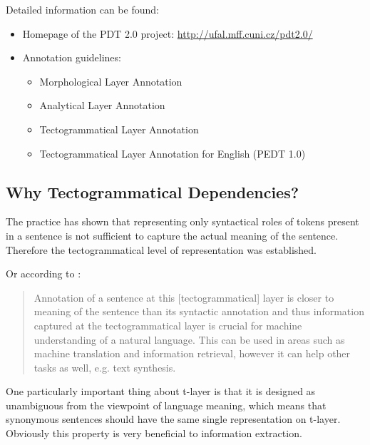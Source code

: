\medskip
Detailed information can be found:
\begin{itemize}
	\item Homepage of the PDT 2.0 project: \url{http://ufal.mff.cuni.cz/pdt2.0/}
	\item Annotation guidelines:	
	\begin{itemize}
		\item Morphological Layer Annotation \citep{mmanCz2005}
		\item Analytical Layer Annotation \citep{amanEn1999}
		\item Tectogrammatical Layer Annotation \citep{biblio:MiBeAnnotationtectogrammatical2006}
		\item Tectogrammatical Layer Annotation for English (PEDT 1.0) \citep{biblio:CiHaAnnotationEnglish2006}
		
	\end{itemize}	
\end{itemize}

\subsection{Why Tectogrammatical Dependencies?}

The practice has shown that representing only syntactical roles of tokens present in a sentence is not sufficient to capture the actual meaning of the sentence. Therefore the tectogrammatical level of representation was established.

Or according to \cite{biblio:KlTransformationBasedTectogrammatical2006}:

\begin{quote}
Annotation of a sentence at this [tectogrammatical] layer is closer to meaning of the sentence than its syntactic annotation and thus information captured at the tectogrammatical layer is crucial for machine understanding of a natural language. This can be used in areas such as machine translation and information retrieval, however it can help other tasks as well, e.g. text synthesis.	
\end{quote}

One particularly important thing about t-layer is that it is designed as unambiguous from the viewpoint of language meaning, which means that synonymous sentences should have the same single representation on t-layer. Obviously this property is very beneficial to information extraction.



